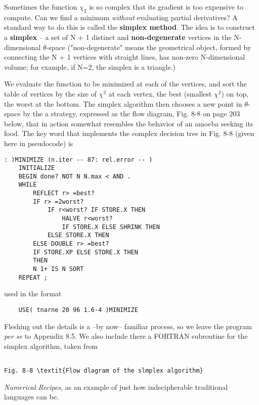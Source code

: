 Sometimes the function $\chi_{2}$ is so complex that its gradient is too expensive to compute. Can we find a minimum \textit{without} evaluating partial derivatives? A standard way to do this is called the \textbf{simplex method}. The idea is to construct a \textbf{simplex} -- a set of N + 1 distinct and \textbf{non-degenerate} vertices in the N-dimensional $\theta$-space ("non-degenerate" means the geometrical object, formed by connecting the N + 1 vertices with straight lines, has non-zero N-dimensional volume; for example, if N=2, the simplex is a triangle.)

We evaluate the function to be minimized at each of the vertices, and sort the table of vertices by the size of $\chi^{2}$ at each vertex, the best (smallest $\chi^{2}$) on top, the worst at the bottom. The simplex algorithm then chooses a new point in $\theta$-space by the a strategy, expressed as the ﬂow diagram, Fig. 8-8 on page 203 below, that in action somewhat resembles the behavior of an amoeba seeking its food. The key word  that implements the complex decision tree in Fig. 8-8 (given here in pseudocode) is

\begin{lstlisting}
: )MINIMIZE (n.iter -- 87: rel.error -- )
    INITIALIZE
    BEGIN done? NOT N N.max < AND .
    WHILE
        REFLECT r> =best?
        IF r> =2worst?
            IF r<worst? IF STORE.X THEN
                HALVE r<worst?
                IF STORE.X ELSE SHRINK THEN
            ELSE STORE.X THEN
        ELSE DOUBLE r> =best?
        IF STORE.XP ELSE STORE.X THEN
        THEN
        N 1+ IS N SORT
    REPEAT ;
\end{lstlisting}

used in the format

\begin{lstlisting}
    USE( tnarne 20 96 1.6-4 )MINIMIZE
\end{lstlisting}

Fleshing out the details is a --by now-- familiar process, so we leave the program \textit{per se} to Appendix 8.5. We also include there a FORTRAN subroutine for the simplex algorithm, taken from

\begin{lstlisting}

Fig. 8-8 \textit{Flow dlagram of the slmplex algorithm}
\end{lstlisting}

\textit{Numerical Recipes}, as an example of just how indecipherable traditional languages can be.

